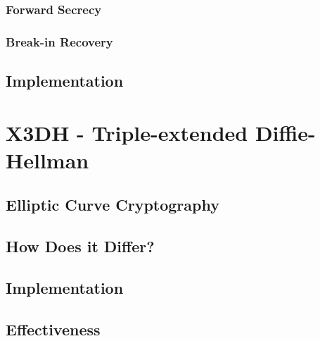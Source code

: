 \documentclass{article}
\theoremstyle{plain}
\begin{document}
\subsubsection{Forward Secrecy}


\subsubsection{Break-in Recovery}


\subsection{Implementation}


\section{X3DH - Triple-extended Diffie-Hellman}


\subsection{Elliptic Curve Cryptography}


\subsection{How Does it Differ?}


\subsection{Implementation}


\subsection{Effectiveness}

\end{document}
